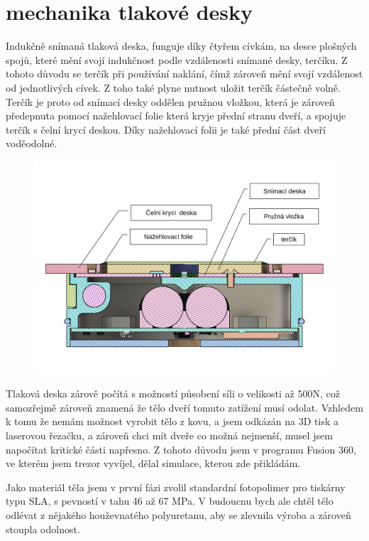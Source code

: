 \section*{mechanika tlakové desky}

Indukčně snímaná tlaková deska, funguje díky čtyřem cívkám, na desce plošných spojů, které mění svojí indukčnost podle vzdálenosti snímané desky, terčíku.
Z tohoto důvodu se terčík při používání naklání, čímž zároveň mění svojí vzdálenost od jednotlivých cívek. Z toho také plyne nutnost uložit terčík
částečně volně. Terčík je proto od snímací desky oddělen pružnou vložkou, která je zároveň předepnuta pomocí nažehlovací folie která kryje přední 
stranu dveří, a spojuje terčík s čelní krycí deskou. Díky nažehlovací folii je také přední část dveří voděodolné.

\begin{figure}[htbp]
    \centering
    \includegraphics[width=\textwidth]{kapitoly/obrazky/E4/machanika_tlakove_desky/rez_po_ose.pdf}
    \caption{}
    \label{fig:rez}
\end{figure}

Tlaková deska zárově počítá s možností působení síli o velikosti až 500N, což samozřejmě zároveň znamená že tělo dveří tomuto zatížení musí odolat.
Vzhledem k tomu že nemám možnost vyrobit tělo z kovu, a jsem odkázán na 3D tisk a laserovou řezačku, a zároveň chci mít dveře co možná nejmenší,
musel jsem napočítat kritické části napřesno. Z tohoto důvodu jsem v programu Fusion 360, ve kterém jsem trezor vyvíjel,
dělal simulace, kterou zde přikládám. 

Jako materiál těla jsem v první fázi zvolil standardní fotopolimer pro tiskárny typu SLA, s pevností v tahu 46 až 67 MPa.
V budoucnu bych ale chtěl tělo odlévat z nějakého houževnatého polyuretanu, aby se zlevnila výroba a zároveň stoupla odolnost.

